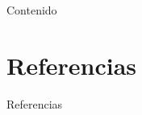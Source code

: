 \documentclass[11pt]{beamer}
\begin{document}
\renewcommand{\contentsname}{Contenido}
  
  \begin{frame}
    
  \end{frame}
	
	\begin{frame}{Contenido}
	  \tiny \tableofcontents
	\end{frame}
	
  
  
  \section{Referencias}
  \begin{frame}{Referencias}
    \tiny
	  
	\end{frame}
	
\end{document}

